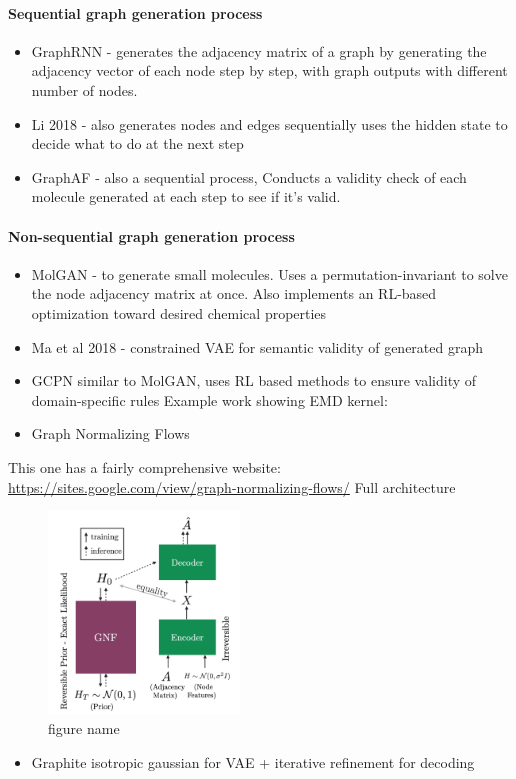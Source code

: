 \documentclass[12pt]{article}
\begin{document}
\paragraph{Sequential graph generation process}
\label{sec:org28d51b7}
\begin{itemize}
\item GraphRNN - generates the adjacency matrix of a graph by generating the adjacency vector of each node step by step, with graph outputs with different number of nodes.
\item Li 2018 - also generates nodes and edges sequentially uses the hidden state to decide what to do at the next step
\item GraphAF - also a sequential process, Conducts a validity check of each molecule generated at each step to see if it's valid.
\end{itemize}
\paragraph{Non-sequential graph generation process}
\label{sec:org9d79f2f}
\begin{itemize}
\item MolGAN - to generate small molecules. Uses a permutation-invariant to solve the node adjacency matrix at once. Also implements an RL-based optimization toward desired chemical properties
\item Ma et al 2018 - constrained VAE for semantic validity of generated graph
\item GCPN similar to MolGAN, uses RL based methods to ensure validity of domain-specific rules Example work showing EMD kernel:
\item Graph Normalizing Flows
\end{itemize}
This one has a fairly comprehensive website: \url{https://sites.google.com/view/graph-normalizing-flows/}
Full architecture

\begin{figure}[htbp]
\centering
\includegraphics[width=2.0in]{./images/full_arch_gnf.png}
\caption{\label{fig:Full architecture of the graph noramlizing flow DNN}figure name}
\end{figure}
\begin{itemize}
\item Graphite isotropic gaussian for VAE + iterative refinement for decoding
\end{itemize}
\end{document}
